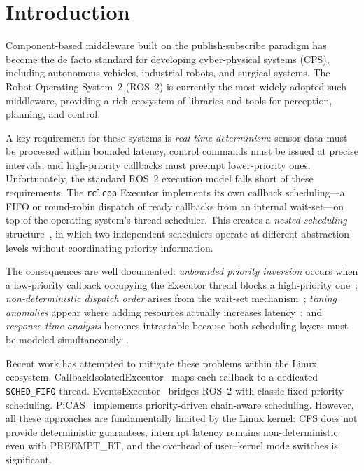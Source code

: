 \section{Introduction}

Component-based middleware built on the publish-subscribe paradigm has become the de facto standard for developing cyber-physical systems (CPS), including autonomous vehicles, industrial robots, and surgical systems.
The Robot Operating System~2 (ROS~2) is currently the most widely adopted such middleware, providing a rich ecosystem of libraries and tools for perception, planning, and control.

A key requirement for these systems is \emph{real-time determinism}: sensor data must be processed within bounded latency, control commands must be issued at precise intervals, and high-priority callbacks must preempt lower-priority ones.
Unfortunately, the standard ROS~2 execution model falls short of these requirements.
The \texttt{rclcpp} Executor implements its own callback scheduling---a FIFO or round-robin dispatch of ready callbacks from an internal wait-set---on top of the operating system's thread scheduler.
This creates a \emph{nested scheduling} structure~\cite{casini2019rtas}, in which two independent schedulers operate at different abstraction levels without coordinating priority information.

The consequences are well documented: \emph{unbounded priority inversion} occurs when a low-priority callback occupying the Executor thread blocks a high-priority one~\cite{casini2019rtas}; \emph{non-deterministic dispatch order} arises from the wait-set mechanism~\cite{sun2024rtss}; \emph{timing anomalies} appear where adding resources actually increases latency~\cite{voronov2024rtas}; and \emph{response-time analysis} becomes intractable because both scheduling layers must be modeled simultaneously~\cite{tang2020rtss,blass2021rtss}.

Recent work has attempted to mitigate these problems within the Linux ecosystem.
CallbackIsolatedExecutor~\cite{ishikawa2025rtas} maps each callback to a dedicated \texttt{SCHED\_FIFO} thread.
EventsExecutor~\cite{teper2024rtss} bridges ROS~2 with classic fixed-priority scheduling.
PiCAS~\cite{choi2021rtas} implements priority-driven chain-aware scheduling.
However, all these approaches are fundamentally limited by the Linux kernel: CFS does not provide deterministic guarantees, interrupt latency remains non-deterministic even with PREEMPT\_RT, and the overhead of user--kernel mode switches is significant.

